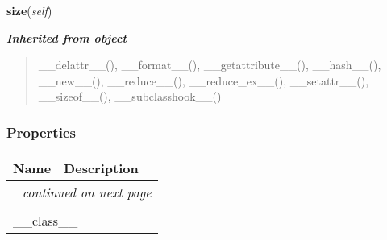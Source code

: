     \vspace{0.5ex}

\hspace{.8\funcindent}\begin{boxedminipage}{\funcwidth}

    \raggedright \textbf{size}(\textit{self})

\setlength{\parskip}{2ex}
\setlength{\parskip}{1ex}
    \end{boxedminipage}


\large{\textbf{\textit{Inherited from object}}}

\begin{quote}
\_\_delattr\_\_(), \_\_format\_\_(), \_\_getattribute\_\_(), \_\_hash\_\_(), \_\_new\_\_(), \_\_reduce\_\_(), \_\_reduce\_ex\_\_(), \_\_setattr\_\_(), \_\_sizeof\_\_(), \_\_subclasshook\_\_()
\end{quote}


  \subsubsection{Properties}

    \vspace{-1cm}
\hspace{\varindent}\begin{longtable}{|p{\varnamewidth}|p{\vardescrwidth}|l}
\cline{1-2}
\cline{1-2} \centering \textbf{Name} & \centering \textbf{Description}& \\
\cline{1-2}
\endhead\cline{1-2}\multicolumn{3}{r}{\small\textit{continued on next page}}\\\endfoot\cline{1-2}
\endlastfoot\multicolumn{2}{|l|}{\textit{Inherited from object}}\\
\multicolumn{2}{|p{\varwidth}|}{\raggedright \_\_class\_\_}\\
\cline{1-2}
\end{longtable}

